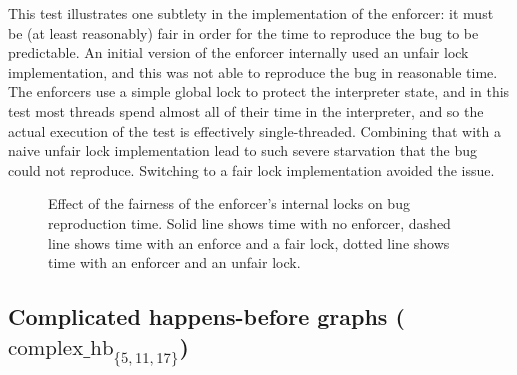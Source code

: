 This test illustrates one subtlety in the implementation of the
enforcer: it must be (at least reasonably) fair in order for the time
to reproduce the bug to be predictable.  An initial version of the
enforcer internally used an unfair lock implementation, and this was
not able to reproduce the bug in reasonable time.  The
{\implementation} enforcers use a simple global lock to protect the
interpreter state, and in this test most threads spend almost all of
their time in the interpreter, and so the actual execution of the test
is effectively single-threaded.  Combining that with a naive unfair
lock implementation lead to such severe starvation that the bug could
not reproduce.  Switching to a fair lock implementation avoided the
issue.

\begin{figure}
  
  \caption{Effect of the fairness of the enforcer's internal locks on
    bug reproduction time.  Solid line shows time with no enforcer,
    dashed line shows time with an enforce and a fair lock, dotted
    line shows time with an enforcer and an unfair lock.}
  \label{fig:eval:multi_threads}
\end{figure}



\subsection{Complicated happens-before graphs ($\textrm{complex\_hb}_{\{5,11,17\}}$)}

